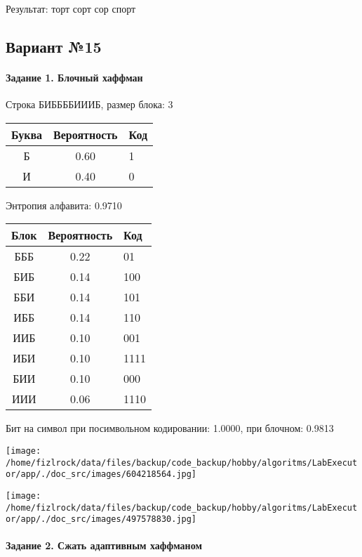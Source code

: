 \documentclass[a4paper, 12pt]{article}
\begin{document}
Результат: торт сорт сор спорт
\pagebreak
\subsection{Вариант №15}
\paragraph{Задание 1. Блочный хаффман \\}

Строка БИББББИИИБ, размер блока: 3
\begin{center}
 \begin{tabular}{ |c|c|l| } 
  \hline
     Буква & Вероятность & Код\\ \hline
Б & 0.60 & 1\\\hline
И & 0.40 & 0
\\ \hline \end{tabular}
\end{center}
Энтропия алфавита: 0.9710
\begin{center}
 \begin{tabular}{ |c|c|l| } 
  \hline
     Блок & Вероятность & Код\\ \hline
БББ & 0.22 & 01\\\hline
БИБ & 0.14 & 100\\\hline
ББИ & 0.14 & 101\\\hline
ИББ & 0.14 & 110\\\hline
ИИБ & 0.10 & 001\\\hline
ИБИ & 0.10 & 1111\\\hline
БИИ & 0.10 & 000\\\hline
ИИИ & 0.06 & 1110
\\ \hline \end{tabular}
\end{center}
Бит на символ при посимвольном кодировании: 1.0000, при блочном: 0.9813

\texttt{[image: /home/fizlrock/data/files/backup/code\_backup/hobby/algoritms/LabExecutor/app/./doc\_src/images/604218564.jpg]}

\texttt{[image: /home/fizlrock/data/files/backup/code\_backup/hobby/algoritms/LabExecutor/app/./doc\_src/images/497578830.jpg]}
\pagebreak
\paragraph{Задание 2. Сжать адаптивным хаффманом\\}
\end{document}

